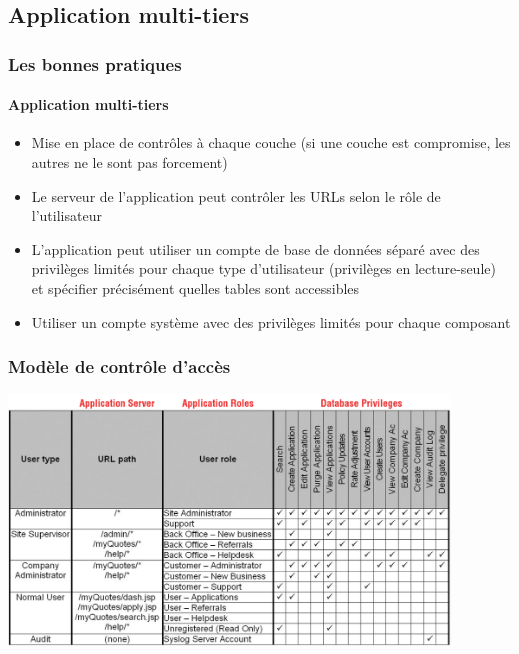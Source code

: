 \documentclass{beamer}
\begin{document}
\subsection{Application multi-tiers}
\begin{frame}
  \frametitle{Les bonnes pratiques}
  \framesubtitle{Application multi-tiers}
  \begin{exampleblock}{}
    \begin{itemize}
      \item Mise en place de contrôles à chaque couche (si une couche est compromise, les autres ne le sont pas forcement)
      \item Le serveur de l'application peut contrôler les URLs selon le rôle de l'utilisateur
      \item L'application peut utiliser un compte de base de données séparé avec des privilèges limités pour chaque type d'utilisateur (privilèges en lecture-seule) et spécifier précisément quelles tables sont accessibles
      \item Utiliser un compte système avec des privilèges limités pour chaque composant
    \end{itemize}
  \end{exampleblock}
\end{frame}

\begin{frame}
  \frametitle{Modèle de contrôle d'accès}
  \begin{center}
    \includegraphics[height=18em]{matrice-droit}
  \end{center}
\end{frame}
\end{document}
